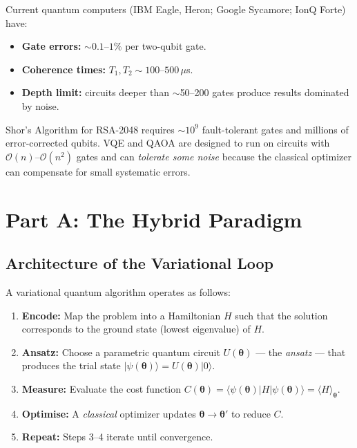 \documentclass[a4paper,11pt]{article}
\newcommand{\ket}[1]{|#1\rangle}
\newcommand{\bra}[1]{\langle#1|}
\newcommand{\expect}[1]{\langle #1 \rangle}
\begin{document}
\begin{warningbox}
Current quantum computers (IBM Eagle, Heron; Google Sycamore; IonQ Forte)
have:
\begin{itemize}
    \item \textbf{Gate errors:} $\sim\!0.1$--$1\%$ per two-qubit gate.
    \item \textbf{Coherence times:} $T_1, T_2 \sim 100$--$500\,\mu$s.
    \item \textbf{Depth limit:} circuits deeper than $\sim$50--200 gates
          produce results dominated by noise.
\end{itemize}
Shor's Algorithm for RSA-2048 requires $\sim\!10^9$ fault-tolerant gates and
millions of error-corrected qubits. VQE and QAOA are designed to run on
circuits with $\mathcal{O}(n)$--$\mathcal{O}(n^2)$ gates and can
\emph{tolerate some noise} because the classical optimizer can compensate
for small systematic errors.
\end{warningbox}

\section{Part A: The Hybrid Paradigm}

\subsection{Architecture of the Variational Loop}

A variational quantum algorithm operates as follows:

\begin{enumerate}
    \item \textbf{Encode:} Map the problem into a Hamiltonian $H$ such that the
          solution corresponds to the ground state (lowest eigenvalue) of $H$.
    \item \textbf{Ansatz:} Choose a parametric quantum circuit
          $U(\boldsymbol\theta)$ — the \emph{ansatz} — that produces the trial
          state $\ket{\psi(\boldsymbol\theta)} = U(\boldsymbol\theta)\ket{0}$.
    \item \textbf{Measure:} Evaluate the cost function
          $C(\boldsymbol\theta) = \bra{\psi(\boldsymbol\theta)}H
          \ket{\psi(\boldsymbol\theta)} = \expect{H}_{\boldsymbol\theta}$.
    \item \textbf{Optimise:} A \emph{classical} optimizer updates
          $\boldsymbol\theta \to \boldsymbol\theta'$ to reduce $C$.
    \item \textbf{Repeat:} Steps 3--4 iterate until convergence.
\end{enumerate}
\end{document}
